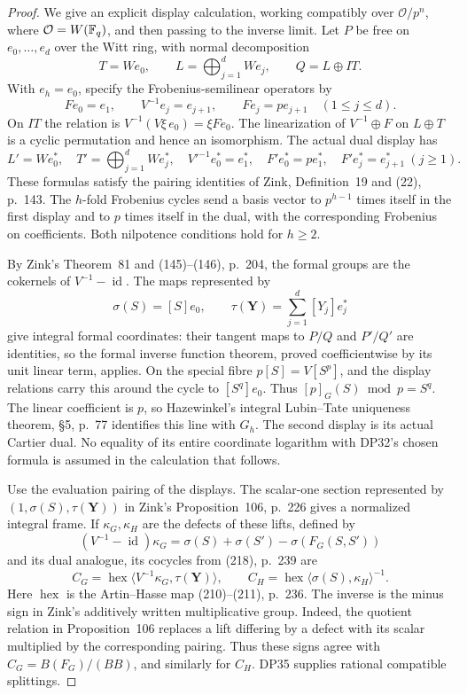 \documentclass[11pt,a4paper]{article}
\theoremstyle{definition}\newtheorem{remark}[theorem]{Remark}
\newcommand{\id}{\operatorname{id}}\newcommand{\Hom}{\operatorname{Hom}}
\begin{document}
\begin{proof}
We give an explicit display calculation, working compatibly over $\mathcal O/p^n$, where $\mathcal O=W(\mathbb F_q)$, and then passing to the inverse limit. Let $P$ be free on $e_0,\ldots,e_d$ over the Witt ring, with normal decomposition
\[
 T=We_0,\qquad L=\bigoplus_{j=1}^dWe_j,\qquad Q=L\oplus IT.
\]
With $e_h=e_0$, specify the Frobenius-semilinear operators by
\[
 Fe_0=e_1,\qquad V^{-1}e_j=e_{j+1},\qquad Fe_j=pe_{j+1}\quad(1\le j\le d).
\]
On $IT$ the relation is $V^{-1}(V\xi\,e_0)=\xi Fe_0$. The linearization of $V^{-1}\oplus F$ on $L\oplus T$ is a cyclic permutation and hence an isomorphism. The actual dual display has
\[
 L'=We_0^*,\quad T'=\bigoplus_{j=1}^dWe_j^*,\quad
 V'^{-1}e_0^*=e_1^*,\quad F'e_0^*=pe_1^*,\quad
 F'e_j^*=e_{j+1}^*\ (j\ge1).
\]
These formulas satisfy the pairing identities of Zink, Definition~19 and (22), p.~143. The $h$-fold Frobenius cycles send a basis vector to $p^{h-1}$ times itself in the first display and to $p$ times itself in the dual, with the corresponding Frobenius on coefficients. Both nilpotence conditions hold for $h\ge2$.

By Zink's Theorem~81 and (145)--(146), p.~204, the formal groups are the cokernels of $V^{-1}-\id$. The maps represented by
\[
 \sigma(S)=[S]e_0,\qquad \tau(\mathbf Y)=\sum_{j=1}^d[Y_j]e_j^*
\]
give integral formal coordinates: their tangent maps to $P/Q$ and $P'/Q'$ are identities, so the formal inverse function theorem, proved coefficientwise by its unit linear term, applies. On the special fibre $p[S]=V[S^p]$, and the display relations carry this around the cycle to $[S^q]e_0$. Thus $[p]_G(S)\bmod p=S^q$. The linear coefficient is $p$, so Hazewinkel's integral Lubin--Tate uniqueness theorem, \S5, p.~77 identifies this line with $G_h$. The second display is its actual Cartier dual. No equality of its entire coordinate logarithm with DP32's chosen formula is assumed in the calculation that follows.

Use the evaluation pairing of the displays. The scalar-one section represented by $(1,\sigma(S),\tau(\mathbf Y))$ in Zink's Proposition~106, p.~226 gives a normalized integral frame. If $\kappa_G,\kappa_H$ are the defects of these lifts, defined by
\[
 (V^{-1}-\id)\kappa_G=\sigma(S)+\sigma(S')-\sigma(F_G(S,S'))
\]
and its dual analogue, its cocycles from (218), p.~239 are
\begin{equation}\label{eq:display-cocycles}
 C_G=\operatorname{hex}\langle V^{-1}\kappa_G,\tau(\mathbf Y)\rangle,
 \qquad C_H=\operatorname{hex}\langle\sigma(S),\kappa_H\rangle^{-1}.
\end{equation}
Here $\operatorname{hex}$ is the Artin--Hasse map (210)--(211), p.~236. The inverse is the minus sign in Zink's additively written multiplicative group. Indeed, the quotient relation in Proposition~106 replaces a lift differing by a defect with its scalar multiplied by the corresponding pairing. Thus these signs agree with $C_G=B(F_G)/(BB)$, and similarly for $C_H$. DP35 supplies rational compatible splittings.


\end{proof}
\end{document}
